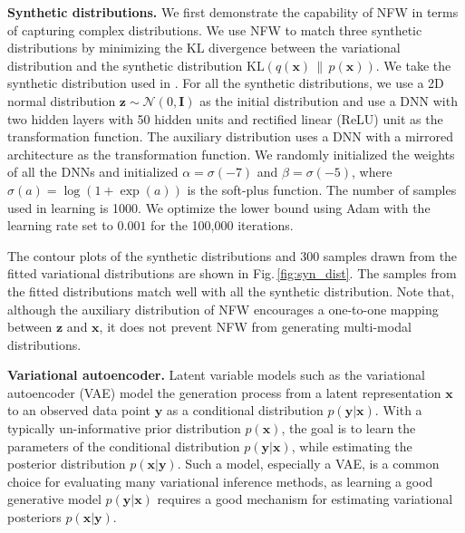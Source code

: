 \documentclass[twoside]{article}
\newcommand{\yV}{\mathbf{y}}
\newcommand{\xV}{\mathbf{x}}
\newcommand{\zV}{\mathbf{z}}
\newcommand{\I}{\mathbf{I}}
\newcommand{\KL}[2]{\text{KL}\left( #1\,\|\,#2 \right)}
\newcommand{\acr}[1]{\textsc{#1}\xspace}
\newcommand{\us}{\acr{NFW}}
\begin{document}

\textbf{Synthetic distributions.} We first demonstrate the capability of \us in terms of capturing complex distributions. We use \us to match three synthetic distributions by minimizing the KL divergence between the variational distribution and the synthetic distribution $\KL{q(\xV)}{p(\xV)}$. We take the synthetic distribution used in \citep{YinZhou2018,TitsiasRuiz2019}. For all the synthetic distributions, we use a 2D normal distribution $\zV \sim \mathcal{N}(0,\I)$ as the initial distribution and use a DNN with two hidden layers with 50 hidden units and rectified linear (ReLU) unit as the transformation function. The auxiliary distribution uses a DNN with a mirrored architecture as the transformation function. We randomly initialized the weights of all the DNNs and initialized $\alpha=\sigma(-7)$ and $\beta=\sigma(-5)$, where $\sigma(a) = \log(1+\exp(a))$ is the soft-plus function. The number of samples used in learning is 1000. We optimize the lower bound using Adam \citep{KingmaBa2015} with the learning rate set to $0.001$ for the 100,000 iterations. 
%

%
The contour plots of the synthetic distributions and 300 samples drawn from the fitted variational distributions are shown in Fig.\,\ref{fig:syn_dist}. The samples from the fitted distributions match well with all the synthetic distribution. Note that, although the auxiliary distribution of \us encourages a one-to-one mapping between $\zV$ and $\xV$, it does not prevent \us from generating multi-modal distributions.


\textbf{Variational autoencoder.} Latent variable models such as the variational autoencoder (VAE) \citep{KingmaWelling2014} model the generation process from a latent representation $\xV$ to an observed data point $\yV$ as a conditional distribution $p(\yV|\xV)$. With a typically un-informative prior distribution $p(\xV)$, the goal is to learn the parameters of the conditional distribution $p(\yV|\xV)$, while estimating the posterior distribution $p(\xV|\yV)$. Such a model, especially a VAE, is a common choice for evaluating many variational inference methods, as learning a good generative model $p(\yV|\xV)$ requires a good mechanism for estimating variational posteriors $p(\xV|\yV)$. 
\end{document}
